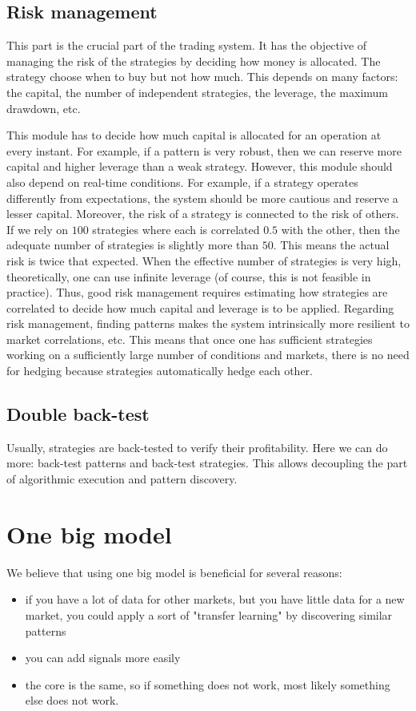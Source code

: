 \documentclass{article}[10pt]
\begin{document}
\subsection{Risk management}
This part is the crucial part of the trading system. It has the objective of managing the risk of the strategies by deciding how money is allocated.
The strategy choose when to buy but not how much. This depends on many factors: the capital, the number of independent strategies, the leverage, the maximum drawdown, etc.

This module has to decide how much capital is allocated for an operation at every instant. For example, if a pattern is very robust, then we can reserve more capital and higher leverage than a weak strategy. However, this module should also depend on real-time conditions. For example, if a strategy operates differently from expectations, the system should be more cautious and reserve a lesser capital. Moreover, the risk of a strategy is connected to the risk of others. If we rely on $100$ strategies where each is correlated $0.5$ with the other, then the adequate number of strategies is slightly more than $50$. This means the actual risk is twice that expected.
    When the effective number of strategies is very high, theoretically, one can use infinite leverage (of course, this is not feasible in practice).
Thus, good risk management requires estimating how strategies are correlated to decide how much capital and leverage is to be applied.
 Regarding risk management, finding patterns makes the system intrinsically more resilient to market correlations, etc. This means that once one has sufficient strategies working on a sufficiently large number of conditions and markets, there is no need for hedging because strategies automatically hedge each other.
  
  
 \subsection{Double back-test}
Usually, strategies are back-tested to verify their profitability. Here we can do more: back-test patterns and back-test strategies. This allows decoupling the part of algorithmic execution and pattern discovery.





\section{One big model}
We believe that using one big model is beneficial for several reasons:
\begin{itemize}
    \item if you have a lot of data for other markets, but you have little data for a new market, you could apply a sort of "transfer learning" by discovering similar patterns
    \item you can add signals more easily
    \item the core is the same, so if something does not work, most likely something else does not work. 
\end{itemize}
\end{document}
